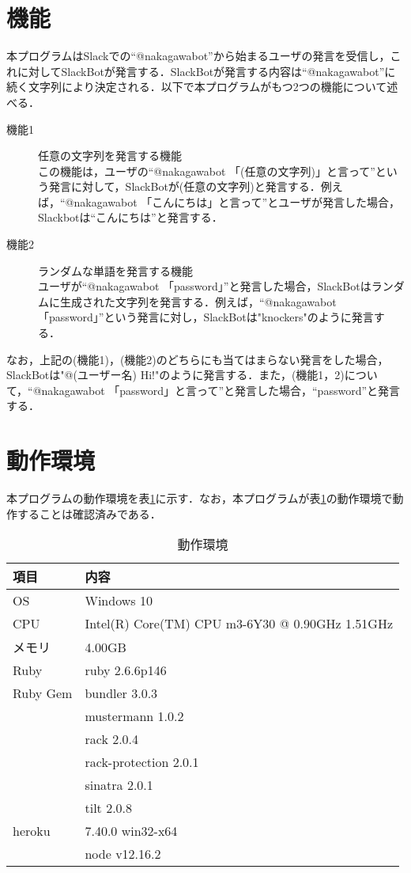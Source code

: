 \documentclass[12pt]{jsarticle}
\begin{document}
\section{機能}\label{sec:function}
本プログラムはSlackでの``@nakagawabot''から始まるユーザの発言を受信し，これに対してSlackBotが発言する．SlackBotが発言する内容は``@nakagawabot''に続く文字列により決定される．以下で本プログラムがもつ2つの機能について述べる．
\begin{description}
\item[機能1] 任意の文字列を発言する機能\\
  この機能は，ユーザの``@nakagawabot 「(任意の文字列)」と言って''という発言に対して，SlackBotが(任意の文字列)と発言する．例えば，``@nakagawabot 「こんにちは」と言って''とユーザが発言した場合，Slackbotは``こんにちは''と発言する．\label{func1}
\item[機能2] ランダムな単語を発言する機能\\
  ユーザが``@nakagawabot 「password」''と発言した場合，SlackBotはランダムに生成された文字列を発言する．例えば，``@nakagawabot 「password」''という発言に対し，SlackBotは"knockers"のように発言する．
\end{description}
なお，上記の(機能1)，(機能2)のどちらにも当てはまらない発言をした場合，SlackBotは"@(ユーザー名) Hi!"のように発言する．また，(機能1，2)について，``@nakagawabot 「password」と言って''と発言した場合，``password''と発言する．

\section{動作環境}\label{sec:env}
本プログラムの動作環境を表\ref{tab:2}に示す．なお，本プログラムが表\ref{tab:2}の動作環境で動作することは確認済みである．
\begin{table}[h]
  \begin{center}
    \caption{動作環境}\label{tab:2}
    \begin{tabular}{l|l}
      \hline\hline
      \multicolumn{1}{l|}{項目} & \multicolumn{1}{l}{内容}\\
      \hline
      OS & Windows 10 \\
      CPU & Intel(R) Core(TM) CPU m3-6Y30 @ 0.90GHz 1.51GHz\\
      メモリ & 4.00GB\\
      Ruby & ruby 2.6.6p146\\
      Ruby Gem & bundler 3.0.3\\
      & mustermann 1.0.2\\
      & rack 2.0.4\\
      & rack-protection 2.0.1\\
      & sinatra 2.0.1\\
      & tilt 2.0.8\\
      heroku & 7.40.0 win32-x64\\
      & node v12.16.2\\
      \hline
    \end{tabular}
  \end{center}
\end{table}
\end{document}
